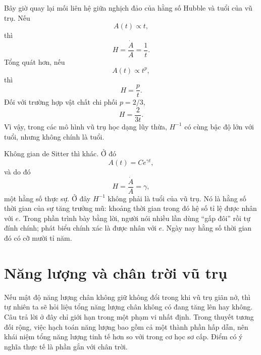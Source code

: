 Bây giờ quay lại mối liên hệ giữa nghịch đảo của hằng số Hubble và tuổi của vũ trụ. Nếu
\begin{equation}
A(t)\propto t,
\end{equation}
thì
\begin{equation}
H=\frac{\dot A}{A}=\frac{1}{t}.
\end{equation}
Tổng quát hơn, nếu
\begin{equation}
A(t)\propto t^p,
\end{equation}
thì
\begin{equation}
H=\frac{p}{t}.
\end{equation}
Đối với trường hợp vật chất chi phối \(p=2/3\),
\begin{equation}
H=\frac{2}{3t}.
\end{equation}
Vì vậy, trong các mô hình vũ trụ học dạng lũy thừa, \(H^{-1}\) có cùng bậc độ lớn với tuổi, nhưng không chính là tuổi.

Không gian de Sitter thì khác. Ở đó
\begin{equation}
A(t)=C e^{\gamma t},
\end{equation}
và do đó
\begin{equation}
H=\frac{\dot A}{A}=\gamma,
\end{equation}
một hằng số thực sự. Ở đây \(H^{-1}\) không phải là tuổi của vũ trụ. Nó là hằng số thời gian của sự tăng trưởng mũ: khoảng thời gian trong đó hệ số tỉ lệ được nhân với \(e\). Trong phần trình bày bằng lời, người nói nhiều lần dùng ``gấp đôi'' rồi tự đính chính; phát biểu chính xác là được nhân với \(e\). Ngày nay hằng số thời gian đó có cỡ mười tỉ năm.

\begin{classroomqa}
\end{classroomqa}

\section{Năng lượng và chân trời vũ trụ}

Nếu mật độ năng lượng chân không giữ không đổi trong khi vũ trụ giãn nở, thì tự nhiên ta sẽ hỏi liệu tổng năng lượng chân không có đang tăng lên hay không. Câu trả lời ở đây chỉ giới hạn trong một phạm vi nhất định. Trong thuyết tương đối rộng, việc hạch toán năng lượng bao gồm cả một thành phần hấp dẫn, nên khái niệm tổng năng lượng tinh tế hơn so với trong cơ học sơ cấp. Điểm có ý nghĩa thực tế là phần gắn với chân trời.

